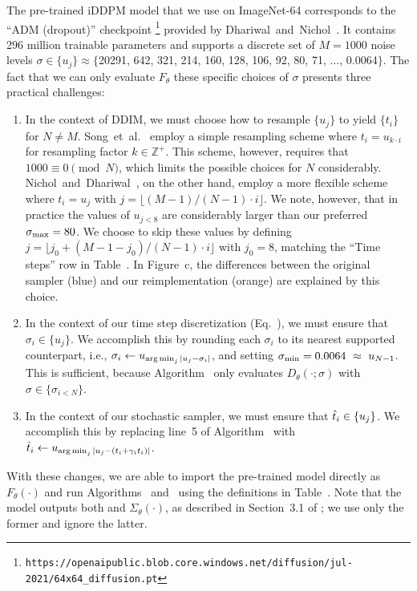 The pre-trained iDDPM model that we use on ImageNet-64 corresponds to the ``ADM (dropout)'' checkpoint%
\footnote{\small\texttt{https://openaipublic.blob.core.windows.net/diffusion/jul-2021/64x64\_diffusion.pt}}
provided by Dhariwal~and~Nichol~\cite{Dhariwal2021}.
It contains 296 million trainable parameters and supports a discrete set of $M = 1000$ noise levels $\sigma \in \{u_j\} \approx \{$20291, 642, 321, 214, 160, 128, 106, 92, 80, 71, $\dots$, 0.0064$\}$.
The fact that we can only evaluate $F_\theta$ these specific choices of $\sigma$ presents three practical challenges:
\begin{enumerate}
\item
In the context of DDIM, we must choose how to resample $\{u_j\}$ to yield $\{t_i\}$ for $N \ne M$.
Song~et~al.~\cite{Song2020ddim} employ a simple resampling scheme where $t_i = u_{k \cdot i}$ for resampling factor $k \in \mathbb{Z}^+$.
This scheme, however, requires that $1000 \equiv 0 \pmod{N}$, which limits the possible choices for $N$ considerably.
Nichol~and~Dhariwal~\cite{Nichol2021a}, on the other hand, employ a more flexible scheme where $t_i = u_j$ with $j = \lfloor (M - 1) / (N - 1) \cdot i \rfloor$.
We note, however, that in practice the values of $u_{j<8}$ are considerably larger than our preferred $\smax = 80$.
We choose to skip these values by defining $j = \lfloor j_0 + (M - 1 - j_0) / (N - 1) \cdot i \rfloor$ with $j_0 = 8$, matching the ``Time steps'' row in Table~.
In Figure~c, the differences between the original sampler (blue) and our reimplementation (orange) are explained by this choice.
\item
In the context of our time step discretization (Eq.~), we must ensure that $\sigma_i \in \{u_j\}$.
We accomplish this by rounding each $\sigma_i$ to its nearest supported counterpart, i.e., $\sigma_i \gets u_{\operatorname{arg\,min}_j |u_j - \sigma_i|}$, and setting $\smin = 0.0064 ~\approx~ u_{N-1}$.
This is sufficient, because Algorithm~ only evaluates $D_\theta(\cdot; \sigma)$ with $\sigma \in \{\sigma_{i<N}\}$.
\item
In the context of our stochastic sampler, we must ensure that $\hat{t}_i \in \{u_j\}$.
We accomplish this by replacing line~5 of Algorithm~ with $\hat{t}_i \gets u_{\operatorname{arg\,min}_j |u_j - (t_i + \gamma_i t_i)|}$.
\end{enumerate}

With these changes, we are able to import the pre-trained model directly as $F_\theta(\cdot)$ and run Algorithms~ and~ using the definitions in Table~.
Note that the model outputs both \smash{$\epsilon_\theta(\cdot)$} and $\Sigma_\theta(\cdot)$, as described in Section~3.1 of \cite{Nichol2021a}; we use only the former and ignore the latter.

